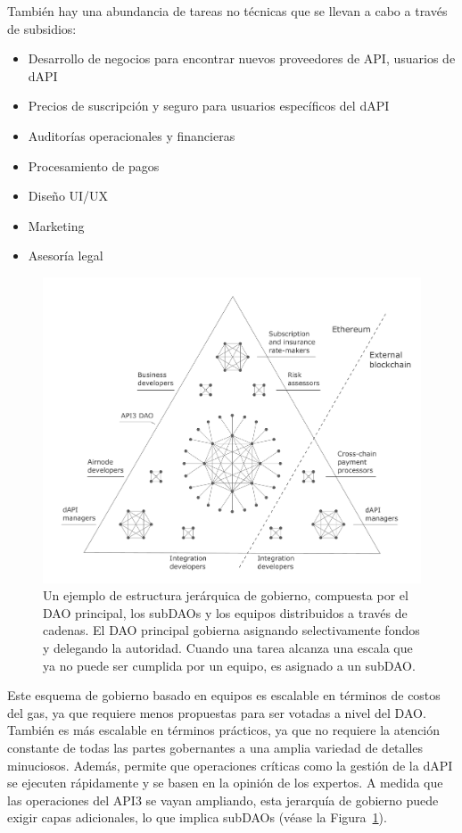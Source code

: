 \documentclass[11pt]{article}
\begin{document}
También hay una abundancia de tareas no técnicas que se llevan a cabo a través de subsidios:
\begin{itemize}
    \item Desarrollo de negocios para encontrar nuevos proveedores de API, usuarios de dAPI
    \item Precios de suscripción y seguro para usuarios específicos del dAPI
    \item Auditorías operacionales y financieras
    \item Procesamiento de pagos
    \item Diseño UI/UX 
    \item Marketing
    \item Asesoría legal
\end{itemize}

\begin{figure}[t]
    \centering
	\includegraphics[width=\textwidth]{fig/dao.pdf}
	\caption{Un ejemplo de estructura jerárquica de gobierno, compuesta por el DAO principal, los subDAOs y los equipos distribuidos a través de cadenas. El DAO principal gobierna asignando selectivamente fondos y delegando la autoridad. Cuando una tarea alcanza una escala que ya no puede ser cumplida por un equipo, es asignado a un subDAO.}
	\label{fig:dao}
\end{figure}

Este esquema de gobierno basado en equipos es escalable en términos de costos del gas, ya que requiere menos propuestas para ser votadas a nivel del DAO. También es más escalable en términos prácticos, ya que no requiere la atención constante de todas las partes gobernantes a una amplia variedad de detalles minuciosos. Además, permite que operaciones críticas como la gestión de la dAPI se ejecuten rápidamente y se basen en la opinión de los expertos. A medida que las operaciones del API3 se vayan ampliando, esta jerarquía de gobierno puede exigir capas adicionales, lo que implica subDAOs (véase la Figura~\ref{fig:dao}).
\end{document}
